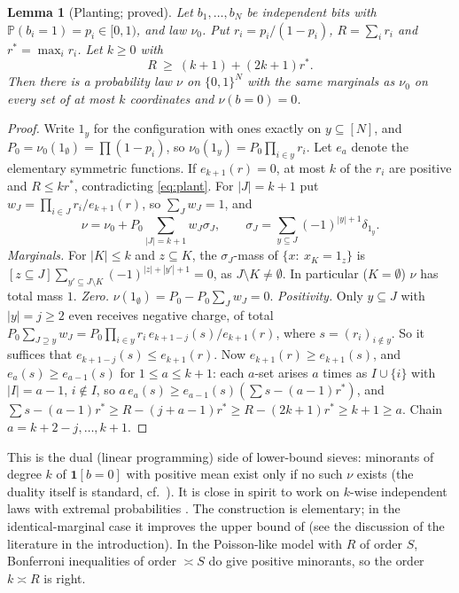 \documentclass[11pt,reqno]{amsart}
\newtheorem{lemma}[theorem]{Lemma}
\theoremstyle{definition}
\newcommand{\PP}{\mathbb P}
\begin{document}
\begin{lemma}[Planting; proved]\label{lem:planting}
Let $b_1,\dots,b_N$ be independent bits with $\PP(b_i=1)=p_i\in[0,1)$, and law
$\nu_0$.  Put $r_i=p_i/(1-p_i)$, $R=\sum_ir_i$ and $r^*=\max_ir_i$.  Let $k\ge0$ with
\begin{equation}\label{eq:plant}
 R\ \ge\ (k+1)+(2k+1)r^* .
\end{equation}
Then there is a probability law $\nu$ on $\{0,1\}^N$ with the same marginals as
$\nu_0$ on every set of at most $k$ coordinates and $\nu(b=0)=0$.
\end{lemma}

\begin{proof}
Write $1_y$ for the configuration with ones exactly on $y\subseteq[N]$, and
$P_0=\nu_0(1_\emptyset)=\prod(1-p_i)$, so $\nu_0(1_y)=P_0\prod_{i\in y}r_i$.  Let
$e_a$ denote the elementary symmetric functions.  If $e_{k+1}(r)=0$, at most
$k$ of the $r_i$ are positive and $R\le kr^*$, contradicting \eqref{eq:plant}.
For $|J|=k+1$ put $w_J=\prod_{i\in J}r_i/e_{k+1}(r)$, so $\sum_Jw_J=1$, and
\[
 \nu=\nu_0+P_0\sum_{|J|=k+1}w_J\sigma_J,\qquad \sigma_J=\sum_{y\subseteq J}(-1)^{|y|+1}\delta_{1_y}.
\]
\emph{Marginals.}  For $|K|\le k$ and $z\subseteq K$, the $\sigma_J$-mass of
$\{x:\ x_K=1_z\}$ is $[z\subseteq J]\sum_{y'\subseteq J\setminus K}(-1)^{|z|+|y'|+1}=0$, as
$J\setminus K\ne\emptyset$.  In particular ($K=\emptyset$) $\nu$ has total mass $1$.
\emph{Zero.}  $\nu(1_\emptyset)=P_0-P_0\sum_Jw_J=0$.
\emph{Positivity.}  Only $y\subseteq J$ with $|y|=j\ge2$ even receives negative
charge, of total $P_0\sum_{J\supseteq y}w_J=P_0\prod_{i\in y}r_i\,e_{k+1-j}(s)/e_{k+1}(r)$, where
$s=(r_i)_{i\notin y}$.  So it suffices that $e_{k+1-j}(s)\le e_{k+1}(r)$.  Now
$e_{k+1}(r)\ge e_{k+1}(s)$, and $e_a(s)\ge e_{a-1}(s)$ for $1\le a\le k+1$: each
$a$-set arises $a$ times as $I\cup\{i\}$ with $|I|=a-1$, $i\notin I$, so
$a\,e_a(s)\ge e_{a-1}(s)(\sum s-(a-1)r^*)$, and
$\sum s-(a-1)r^*\ge R-(j+a-1)r^*\ge R-(2k+1)r^*\ge k+1\ge a$.  Chain
$a=k+2-j,\dots,k+1$.
\end{proof}

This is the dual (linear programming) side of lower-bound sieves:
minorants of degree $k$ of $\mathbf 1[b=0]$ with positive mean exist only if
no such $\nu$ exists (the duality itself is standard, cf.\ \cite[Thm.~5]{Tao254A}).  It is close in spirit to work on $k$-wise independent
laws with extremal probabilities \cite{BGP,PYY}.  The construction is
elementary; in the identical-marginal case it improves the upper bound of
\cite[Thm.~27]{BGP} (see the discussion of the literature in the
introduction).  In the Poisson-like model with $R$ of order $S$, Bonferroni inequalities
of order $\asymp S$ do give positive minorants, so the order $k\asymp R$ is
right.
\end{document}
